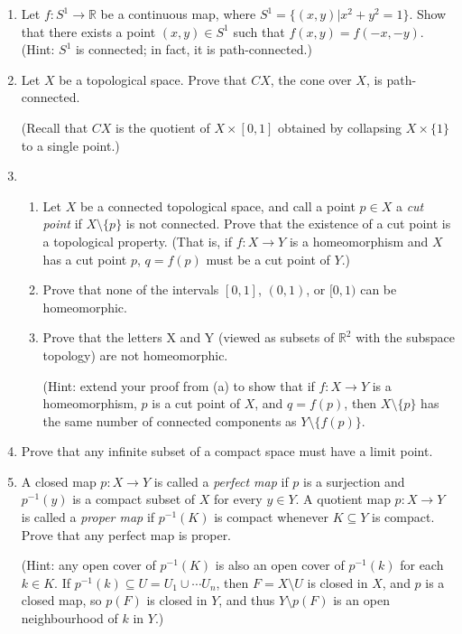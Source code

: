 \documentclass[letterpaper,12pt]{article}
\newcommand{\R}{\mathbb{R}}
\begin{document}
\begin{enumerate}
\item Let $f:S^1\to \R$ be a continuous map, where $S^1=\{(x,y) | x^2+y^2=1\}$. Show that there exists a point $(x,y)\in S^1$ such that $f(x,y)=f(-x,-y)$. (Hint: $S^1$ is connected; in fact, it is path-connected.)
\item Let $X$ be a topological space. Prove that $CX$, the cone over $X$, is path-connected.

(Recall that $CX$ is the quotient of $X\times [0,1]$ obtained by collapsing $X\times\{1\}$ to a single point.)

\item \begin{enumerate}
\item Let $X$ be a connected topological space, and call a point $p\in X$ a {\em cut point} if $X\setminus \{p\}$ is not connected. Prove that the existence of a cut point is a topological property. (That is, if $f:X\to Y$ is a homeomorphism and $X$ has a cut point $p$, $q=f(p)$ must be a cut point of $Y$.)
\item Prove that none of the intervals $[0,1]$, $(0,1)$, or $[0,1)$ can be homeomorphic. 
\item Prove that the letters X and Y (viewed as subsets of $\R^2$ with the subspace topology) are not homeomorphic.

(Hint: extend your proof from (a) to show that if $f:X\to Y$ is a homeomorphism, $p$ is a cut point of $X$, and $q=f(p)$, then $X\setminus \{p\}$ has the same number of connected components as $Y\setminus \{f(p)\}$.
\end{enumerate}
\item Prove that any infinite subset of a compact space must have  a limit point.
\item A closed map $p:X\to Y$ is called a {\em perfect map} if $p$ is a surjection and $p^{-1}(y)$ is a compact subset of $X$ for every $y\in Y$. A quotient map $p:X\to Y$ is called a {\em proper map} if $p^{-1}(K)$ is compact whenever $K\subseteq Y$ is compact. Prove that any perfect map is proper.

(Hint: any open cover of $p^{-1}(K)$ is also an open cover of $p^{-1}(k)$ for each $k\in K$. If $p^{-1}(k)\subseteq U=U_1\cup\cdots U_n$, then $F=X\setminus U$ is closed in $X$, and $p$ is a closed map, so $p(F)$ is closed in $Y$, and thus $Y\setminus p(F)$ is an open neighbourhood of $k$ in $Y$.)
\end{enumerate}
\end{document}
